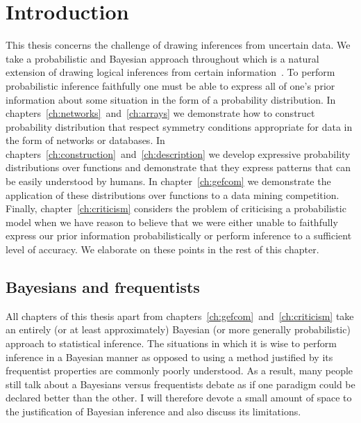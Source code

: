 
\inbpdocument

\chapter{Introduction}
\label{ch:intro}

This thesis concerns the challenge of drawing inferences from uncertain data.
We take a probabilistic and Bayesian approach throughout  which is a natural extension of drawing logical inferences from certain information~\citep[e.g.][]{Jaynes2003-jh}.
To perform probabilistic inference faithfully one must be able to express all of one's prior information about some situation in the form of a probability distribution.
In chapters~\ref{ch:networks}~and~\ref{ch:arrays} we demonstrate how to construct probability distribution that respect symmetry conditions appropriate for data in the form of networks or databases.
In chapters~\ref{ch:construction}~and~\ref{ch:description} we develop expressive probability distributions over functions and demonstrate that they express patterns that can be easily understood by humans.
In chapter~\ref{ch:gefcom} we demonstrate the application of these distributions over functions to a data mining competition.
Finally, chapter~\ref{ch:criticism} considers the problem of criticising a probabilistic model when we have reason to believe that we were either unable to faithfully express our prior information probabilistically or perform inference to a sufficient level of accuracy.
We elaborate on these points in the rest of this chapter.

\section{Bayesians and frequentists}

All chapters of this thesis apart from chapters~\ref{ch:gefcom}~and~\ref{ch:criticism} take an entirely (or at least approximately) Bayesian (or more generally probabilistic) approach to statistical inference.
The situations in which it is wise to perform inference in a Bayesian manner as opposed to using a method justified by its frequentist properties are commonly poorly understood.
As a result, many people still talk about a Bayesians versus frequentists debate as if one paradigm could be declared better than the other\footnotemark{}.
I will therefore devote a small amount of space to the justification of Bayesian inference and also discuss its limitations.

